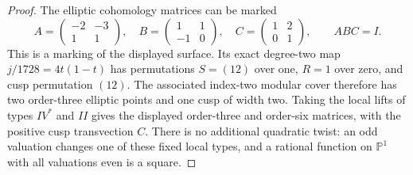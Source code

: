 \begin{proof}
The elliptic cohomology matrices can be marked \[
 A=\begin{pmatrix}-2&-3\\1&1\end{pmatrix},\quad
 B=\begin{pmatrix}1&1\\-1&0\end{pmatrix},\quad
 C=\begin{pmatrix}1&2\\0&1\end{pmatrix},\qquad ABC=I.
\] This is a marking of the displayed surface. Its exact degree-two map \(j/1728=4t(1-t)\) has permutations \(S=(12)\) over one, \(R=1\) over zero, and cusp permutation \((12)\). The associated index-two modular cover therefore has two order-three elliptic points and one cusp of width two. Taking the local lifts of types \(IV^*\) and \(II\) gives the displayed order-three and order-six matrices, with the positive cusp transvection \(C\). There is no additional quadratic twist: an odd valuation changes one of these fixed local types, and a rational function on \(\mathbb P^1\) with all valuations even is a square.


\end{proof}
